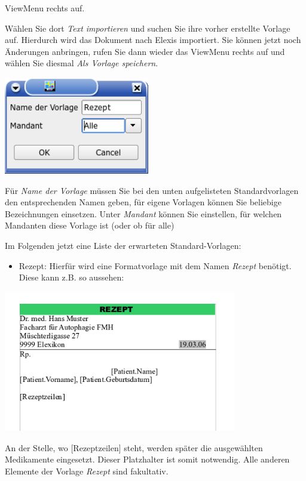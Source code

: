 ViewMenu rechts auf.

Wählen Sie dort \textit{Text importieren} und suchen Sie ihre vorher erstellte Vorlage auf.
 Hierdurch wird das Dokument nach Elexis importiert. Sie können jetzt noch Änderungen anbringen, rufen Sie dann wieder das ViewMenu rechts auf und wählen Sie diesmal \textit{Als Vorlage speichern}.

\includegraphics[width=2.5in]{images/rezept1.png}

Für \textit{Name der Vorlage} müssen Sie bei den unten aufgelisteten Standardvorlagen den entsprechenden Namen geben, für eigene Vorlagen können Sie beliebige Bezeichnungen einsetzen. Unter \textit{Mandant} können Sie einstellen, für welchen Mandanten diese Vorlage ist (oder ob für alle)

Im Folgenden jetzt eine Liste der erwarteten Standard-Vorlagen:

\begin{itemize}
\item Rezept: Hierfür wird eine Formatvorlage mit dem Namen \textit{Rezept} benötigt. Diese kann z.B. so aussehen:
 \end{itemize}
\includegraphics[width=4in]{images/rezept.png}

An der Stelle, wo [Rezeptzeilen] steht, werden später die ausgewählten Medikamente eingesetzt. Dieser Platzhalter ist somit notwendig. Alle anderen Elemente der Vorlage \textit{Rezept} sind fakultativ.

